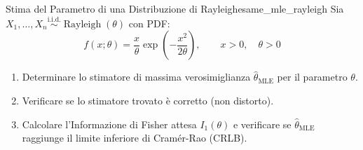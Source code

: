 \begin{esercizio}{Stima del Parametro di una Distribuzione di Rayleigh}{esame_mle_rayleigh}
Sia $X_1, \dots, X_n \stackrel{\text{i.i.d.}}{\sim} \operatorname{Rayleigh}(\theta)$ con PDF:
\begin{equation*}
    f(x; \theta) = \frac{x}{\theta} \exp\left(-\frac{x^2}{2\theta}\right), \qquad x > 0, \quad \theta > 0
\end{equation*}
\begin{enumerate}
    \item Determinare lo stimatore di massima verosimiglianza $\widehat{\theta}_{\text{MLE}}$ per il parametro $\theta$.
    \item Verificare se lo stimatore trovato è corretto (non distorto).
    \item Calcolare l'Informazione di Fisher attesa $I_1(\theta)$ e verificare se $\widehat{\theta}_{\text{MLE}}$ raggiunge il limite inferiore di Cramér-Rao (CRLB).
\end{enumerate}
\end{esercizio}

